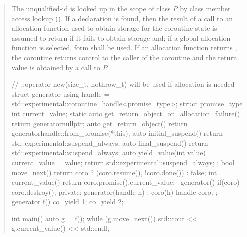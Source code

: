 \begin{quote}



\pnum
The unqualified-id  is looked up in the scope of class \textit{P}
by class member access lookup (). If a declaration is found, then the result of a call to an allocation function used to obtain storage for the coroutine state is assumed to return  if it fails to obtain storage and; if a global allocation function is selected,  form shall be used.
If an allocation function returns , the coroutine returns control to the caller of the coroutine and the return value is obtained by a call to $P$.

\enterexample
\begin{codeblock}
// ::operator new(size_t, nothrow_t) will be used if allocation is needed
struct generator {
  using handle = std::experimental::coroutine_handle<promise_type>;
  struct promise_type {
    int current_value;
    static auto get_return_object_on_allocation_failure() { return generator{nullptr}; }
    auto get_return_object() { return generator{handle::from_promise(*this)}; }
    auto initial_suspend() { return std::experimental::suspend_always{}; }
    auto final_suspend() { return std::experimental::suspend_always{}; }
    auto yield_value(int value) { 
      current_value = value; 
      return std::experimental::suspend_always{};
    }
  };
  bool move_next() { return coro ? (coro.resume(), !coro.done()) : false; }
  int current_value() { return coro.promise().current_value; }
  ~generator() { if(coro) coro.destroy(); }
private:
  generator(handle h) : coro(h) {}
  handle coro;
};
generator f() { co_yield 1;  co_yield 2; }
 
int main() {
  auto g = f();
  while (g.move_next()) std::cout << g.current_value() << std::endl;
}


\end{codeblock}
\end{quote}
